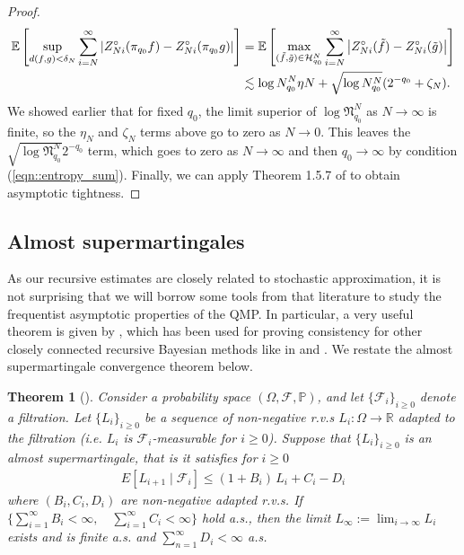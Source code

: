 \documentclass[11pt,a4paper]{article}
\newtheorem{thm}{Theorem}
\newcommand{\R}{\mathbb{R}}
\newcommand{\E}{\mathbb{E}}
\begin{document}
\begin{appendices}
\begin{proof}
    \begin{align*}
       \E\left[ \sup_{d(f,g) < \delta_{N}} \sum_{i=N}^{\infty} \left|Z_{Ni}^{\circ}(\pi_{q_0}f) - Z_{Ni}^{\circ}(\pi_{q_0}g)\right|\right] &=\E\left[ \max_{(\Tilde{f},\Tilde{g}) \in \mathcal{H}_{q_0}^{N}} \sum_{i=N}^{\infty} \left|Z_{Ni}^{\circ}(\Tilde{f}) - Z_{Ni}^{\circ}(\Tilde{g})\right|\right]\\
        &\lesssim \log N_{q_0}^{N}\eta{N} + \sqrt{\log N_{q_0}^{N}}(2^{-q_{0}} + \zeta_{N}).
    \end{align*}
    We showed earlier that for fixed $q_{0}$, the limit superior of $\log \mathfrak{N}_{q_0}^{N}$ as $N \rightarrow \infty$ is finite, so the $\eta_{N}$ and $\zeta_{N}$ terms above go to zero as $N \rightarrow 0$. This leaves the $\sqrt{\log \mathfrak{N}_{q_0}^{N}}2^{-q_{0}}$ term, which goes to zero as $N \rightarrow \infty$ and then $q_{0} \rightarrow \infty$ by condition (\ref{eqn::entropy_sum}). Finally, we can apply Theorem 1.5.7 of \cite{vanderVaart2023} to obtain asymptotic tightness.
\end{proof}

\subsection{Almost supermartingales}
As our recursive estimates are closely related to stochastic approximation, it is not surprising that we will borrow some tools from that literature to study the frequentist asymptotic properties of the QMP. In particular, a very useful theorem is given by \cite{Robbins1971}, which has been used for proving consistency for other closely connected recursive Bayesian methods like in \citet{Martin2009,Hahn2018} and \citet{Fong2023a}. We restate the almost supermartingale convergence theorem below.
\begin{thm}[{\cite[]{Robbins1971}}]\label{app:thm_asmart}
Consider a probability space $(\Omega,\mathcal{F},\mathbb{P})$, and let $\{\mathcal{F}_i\}_{i \geq 0}$ denote a filtration. Let $\{L_i\}_{i \geq 0}$ be a sequence of non-negative r.v.s $L_i:\Omega \to \R$ adapted to the filtration (i.e. $L_i$ is $\mathcal{F}_i$-measurable for $i \geq 0$). Suppose that $\{L_i\}_{i \geq 0}$ is an {almost supermartingale}, that is it satisfies for $i \geq 0$
\begin{align*}
E[L_{i+1} \mid \mathcal{F}_{i}]  \leq (1+B_i)\, L_{i} + C_i - D_i
\end{align*}
where $(B_i, C_i, D_i)$ are non-negative adapted r.v.s. 
If $\{\sum_{i=1}^\infty B_i < \infty,\quad  \sum_{i=1}^\infty C_i< \infty\}$ hold a.s., then the limit $L_\infty:=\lim_{i\to \infty} L_i $ exists and is finite a.s. and $\sum_{n=1}^\infty D_i < \infty $ a.s.
\end{thm}



\end{appendices}
\end{document}
